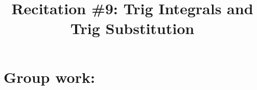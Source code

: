 \documentclass[noinstructornotes]{ximera}
\title{Recitation \#9: Trig Integrals and Trig Substitution}
\begin{document}
\begin{abstract}		\end{abstract}
\maketitle

\section{Group work:}
\end{document}
